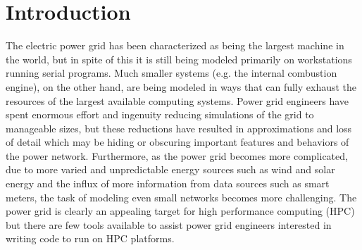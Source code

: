 \documentclass[preprint]{acm_proc_article-sp}
\begin{document}
\maketitle
\begin{abstract}
This paper describes the GridPACK\texttrademark framework, which is designed to help
power grid engineers develop modeling software capable of running on high
performance computers. The framework contains modules for setting up distributed
power grid networks, assigning buses and branches with arbitrary behaviors to
the network, creating distributed matrices and vectors, using parallel linear
and non-linear solvers to solve algebraic equations, and mapping functionality
to create matrices and vectors based on properties of the network. In addition,
the framework contains additional functionality to support IO and to manage
errors. The goal of GridPACK\texttrademark is to provide developers with a
comprehensive set of modules that can substantially reduce the complexity of
writing software for parallel computers
while still providing efficient and scalable software solutions.
\end{abstract}


\section{Introduction}
The electric power grid has been characterized as being the largest machine in
the world, but in spite of this it is still being modeled primarily on workstations running
serial programs. Much smaller systems (e.g. the internal combustion engine\cite{EXACT}),
on the other hand, are being modeled in ways that can fully exhaust the resources of
the largest available computing systems. Power grid engineers have spent
enormous effort and ingenuity reducing simulations of the grid to manageable sizes,
but these reductions have resulted in approximations and loss of detail which may
be hiding or obscuring important features and behaviors of the power network.
Furthermore, as the
power grid becomes more complicated, due to more varied and unpredictable energy sources
such as wind and solar energy and the influx of more information from data sources
such as smart
meters, the task of modeling even small networks becomes more challenging. The
power grid is clearly an appealing target for high performance computing (HPC)
but there are few
tools available to assist power grid engineers interested in writing code to run on
HPC platforms.
\end{document}
